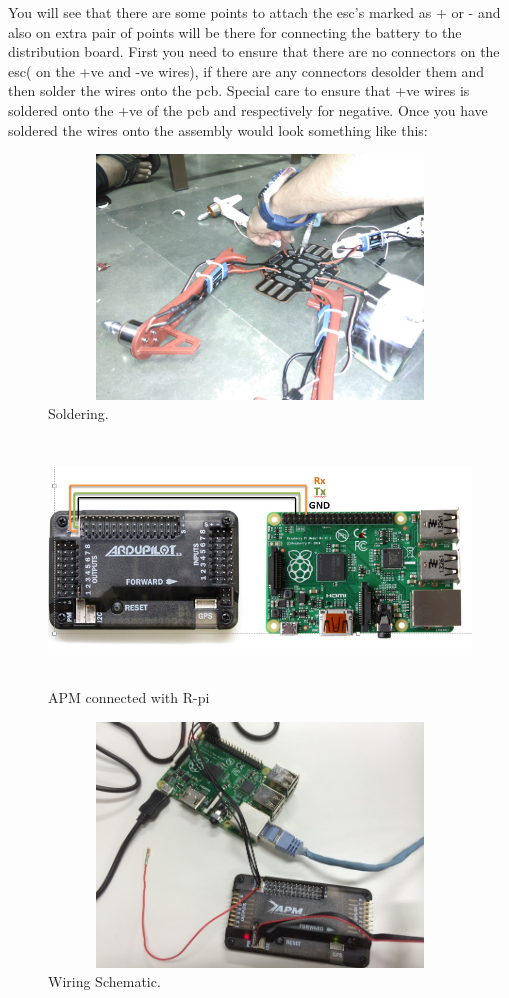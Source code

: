 \documentclass[a4paper,12pt,oneside]{book}
\begin{document}
You will see that there are some points to attach the esc's marked as + or - and also on extra pair of points will be there for connecting the battery to the distribution board. First you need to ensure that there are no connectors on the esc( on the +ve and -ve wires), if there are any connectors desolder them and then solder the wires onto the pcb. Special care to ensure that +ve wires is soldered onto the +ve of the pcb and respectively for negative. Once you have soldered the wires onto the assembly would look something like this:
		\begin{figure}[H]
	 	
	 	\centering
		\includegraphics[width=12cm,height=6.5cm]{solder}
		\caption{Soldering.}
		\end{figure}
		
		\begin{figure}[H]
	 	
	 	\centering
		\includegraphics[width=12cm,height=6.5cm]{apmtopi}
		\caption{APM connected with R-pi}
		\end{figure}
		\begin{figure}[H]
		\centering
		\includegraphics[width=12cm,height=6.5cm]{photo}
		\caption{Wiring Schematic.}
		\end{figure}
		
\end{document}
